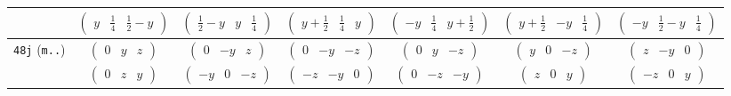 \documentclass[fleqn,9pt,landscape]{jsarticle}
\begin{document}
\begin{center}
\begin{longtable}{ccccccc}
& $ \begin{pmatrix} y & \frac{1}{4} & \frac{1}{2} - y \end{pmatrix} $ & $ \begin{pmatrix} \frac{1}{2} - y & y & \frac{1}{4} \end{pmatrix} $ & $ \begin{pmatrix} y + \frac{1}{2} & \frac{1}{4} & y \end{pmatrix} $ & $ \begin{pmatrix} - y & \frac{1}{4} & y + \frac{1}{2} \end{pmatrix} $ & $ \begin{pmatrix} y + \frac{1}{2} & - y & \frac{1}{4} \end{pmatrix} $ & $ \begin{pmatrix} - y & \frac{1}{2} - y & \frac{1}{4} \end{pmatrix} $ \\ \hline
{\tt 48j} ({\tt m..}) & $ \begin{pmatrix} 0 & y & z \end{pmatrix} $ & $ \begin{pmatrix} 0 & - y & z \end{pmatrix} $ & $ \begin{pmatrix} 0 & - y & - z \end{pmatrix} $ & $ \begin{pmatrix} 0 & y & - z \end{pmatrix} $ & $ \begin{pmatrix} y & 0 & - z \end{pmatrix} $ & $ \begin{pmatrix} z & - y & 0 \end{pmatrix} $ \\
& $ \begin{pmatrix} 0 & z & y \end{pmatrix} $ & $ \begin{pmatrix} - y & 0 & - z \end{pmatrix} $ & $ \begin{pmatrix} - z & - y & 0 \end{pmatrix} $ & $ \begin{pmatrix} 0 & - z & - y \end{pmatrix} $ & $ \begin{pmatrix} z & 0 & y \end{pmatrix} $ & $ \begin{pmatrix} - z & 0 & y \end{pmatrix} $ \\

\end{longtable}
\end{center}
\end{document}
